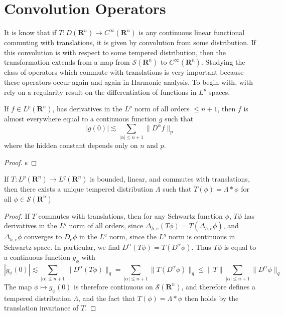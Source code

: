 \section{Convolution Operators}

It is know that if $T: D(\mathbf{R}^n) \to C^\infty(\mathbf{R}^n)$ is any continuous linear functional commuting with translations, it is given by convolution from some distribution. If this convolution is with respect to some tempered distribution, then the transformation extends from a map from $\mathcal{S}(\mathbf{R}^n)$ to $C^\infty(\mathbf{R}^n)$. Studying the class of operators which commute with translations is very important because these operators occur again and again in Harmonic analysis. To begin with, with rely on a regularity result on the differentiation of functions in $L^p$ spaces.

\begin{lemma}
	If $f \in L^p(\mathbf{R}^n)$, has derivatives in the $L^p$ norm of all orders $\leq n+1$, then $f$ is almost everywhere equal to a continuous function $g$ such that
	\[ |g(0)| \lesssim \sum_{|\alpha| \leq n + 1} \| D^\alpha f \|_p \]
	where the hidden constant depends only on $n$ and $p$.
\end{lemma}
\begin{proof}
	s
\end{proof}

\begin{theorem}
	If $T: L^p(\mathbf{R}^n) \to L^q(\mathbf{R}^n)$ is bounded, linear, and commutes with translations, then there exists a unique tempered distribution $\Lambda$ such that $T(\phi) = \Lambda * \phi$ for all $\phi \in \mathcal{S}(\mathbf{R}^n)$
\end{theorem}
\begin{proof}
	If $T$ commutes with translations, then for any Schwartz function $\phi$, $T\phi$ has derivatives in the $L^q$ norm of all orders, since $\Delta_{h,e}(T \phi) = T(\Delta_{h,e} \phi)$, and $\Delta_{h,e} \phi$ converges to $D_e \phi$ in the $L^q$ norm, since the $L^q$ norm is continuous in Schwartz space. In particular, we find $D^\alpha (T\phi) = T(D^\alpha \phi)$. Thus $T\phi$ is equal to a continuous function $g_\phi$ with
	\[ |g_\phi(0)| \lesssim \sum_{|\alpha| \leq n+1} \| D^\alpha(T\phi) \|_q = \sum_{|\alpha| \leq n+1} \| T(D^\alpha \phi) \|_q \leq \| T \| \sum_{|\alpha| \leq n+1} \| D^\alpha \phi \|_q \]
	The map $\phi \mapsto g_\phi(0)$ is therefore continuous on $\mathcal{S}(\mathbf{R}^n)$, and therefore defines a tempered distribution $\Lambda$, and the fact that $T(\phi) = \Lambda * \phi$ then holds by the translation invariance of $T$.
\end{proof}

